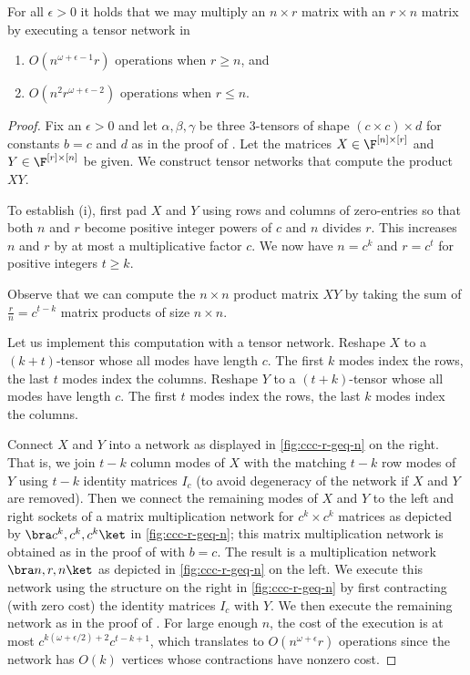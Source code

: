 \begin{lemma}
\label{lem:rmm}
For all $\epsilon>0$ it holds that we may multiply an $n\times r$ matrix
with an $r\times n$ matrix by executing a tensor network in
\begin{enumerate}%
\item
$O(n^{\omega+\epsilon-1}r)$ operations when $r\geq n$, and
\item
$O(n^2r^{\omega+\epsilon-2})$ operations when $r\leq n$.
\end{enumerate}
\end{lemma}

\begin{proof}
Fix an $\epsilon>0$ and let $\alpha,\beta,\gamma$ be three 3-tensors
of shape $(c\times c)\times d$ for constants $b=c$ and $d$
as in the proof of .
Let the matrices $X\in\F^{[n]\times [r]}$ and $Y\in\F^{[r]\times[n]}$
be given. We construct tensor networks that compute the product $XY$.

To establish (i), first pad $X$ and $Y$ using rows and columns
of zero-entries so that both $n$ and $r$
become positive integer powers of $c$ and $n$ divides $r$.
This increases $n$ and $r$ by at most a multiplicative factor $c$.
We now have $n=c^k$ and $r=c^t$ for positive integers $t\geq k$.

Observe that we can compute the $n\times n$ product matrix $XY$ by
taking the sum of $\frac{r}{n}=c^{t-k}$ matrix products of size $n\times n$.

Let us implement this computation with a tensor network.
Reshape
$X$ to a $(k+t)$-tensor whose all modes have length $c$. The first $k$ modes
index the rows, the last $t$ modes index the columns.
Reshape
$Y$ to a $(t+k)$-tensor whose all modes have length $c$. The first $t$ modes
index the rows, the last $k$ modes index the columns.

Connect $X$ and $Y$ into a network as displayed in \eqref{fig:ccc-r-geq-n}
on the right.
That is,
we join $t-k$ column modes of $X$ with the matching $t-k$ row modes of $Y$
using $t-k$ identity matrices $I_c$
(to avoid degeneracy of the network if $X$ and $Y$ are removed).
Then we connect the remaining modes of $X$ and $Y$
to the left and right sockets of a matrix multiplication network
for $c^k\times c^k$ matrices as depicted by $\bra c^k,c^k,c^k\ket$
in \eqref{fig:ccc-r-geq-n}; this matrix multiplication network is obtained
as in the proof of  with $b=c$. The result is a multiplication
network $\bra n,r,n\ket$ as depicted in \eqref{fig:ccc-r-geq-n} on the left.
We execute this network using the structure on the right in
\eqref{fig:ccc-r-geq-n} by first
contracting (with zero cost)
the identity matrices $I_c$ with $Y$. We then execute the
remaining network as in the proof of .
For large enough $n$, the cost of the execution is at most
$c^{k(\omega+\epsilon/2)+2}c^{t-k+1}$, which translates to
$O(n^{\omega+\epsilon}r)$ operations since the network
has $O(k)$ vertices whose contractions have nonzero cost.


\end{proof}
